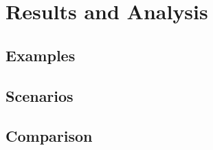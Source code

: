 \section{Results and Analysis}
\label{sec:analysis}


\subsection{Examples}

\subsection{Scenarios}

\subsection{Comparison}